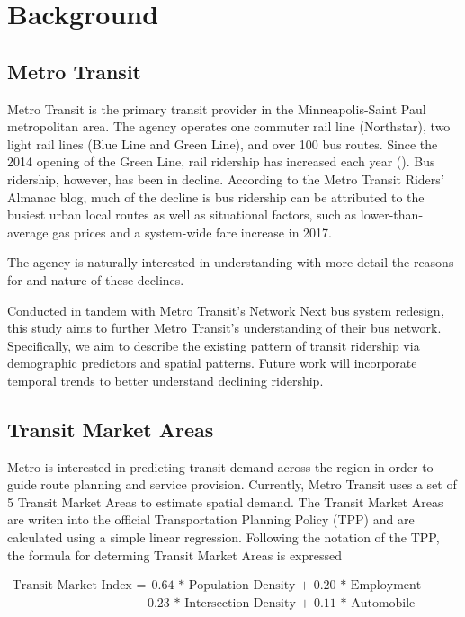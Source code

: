 \documentclass[]{article}
\begin{document}
\section{Background}\label{background}

\subsection{Metro Transit}\label{metro-transit}

Metro Transit is the primary transit provider in the Minneapolis-Saint
Paul metropolitan area. The agency operates one commuter rail line
(Northstar), two light rail lines (Blue Line and Green Line), and over
100 bus routes. Since the 2014 opening of the Green Line, rail ridership
has increased each year (). Bus ridership, however, has been in decline.
According to the Metro Transit Riders' Almanac blog, much of the decline
is bus ridership can be attributed to the busiest urban local routes as
well as situational factors, such as lower-than-average gas prices and a
system-wide fare increase in 2017.

The agency is naturally interested in understanding with more detail the
reasons for and nature of these declines.

Conducted in tandem with Metro Transit's Network Next bus system
redesign, this study aims to further Metro Transit's understanding of
their bus network. Specifically, we aim to describe the existing pattern
of transit ridership via demographic predictors and spatial patterns.
Future work will incorporate temporal trends to better understand
declining ridership.

\subsection{Transit Market Areas}\label{transit-market-areas}

Metro is interested in predicting transit demand across the region in
order to guide route planning and service provision. Currently, Metro
Transit uses a set of 5 Transit Market Areas to estimate spatial demand.
The Transit Market Areas are writen into the official Transportation
Planning Policy (TPP) and are calculated using a simple linear
regression. Following the notation of the TPP, the formula for determing
Transit Market Areas is expressed

\[
\begin{aligned}
\text{Transit Market Index } = & \text{ 0.64 * Population Density + 0.20 * Employment Density +} \\
& \text{0.23 * Intersection Density + 0.11 * Automobile Availability}
\end{aligned}
\]
\end{document}
